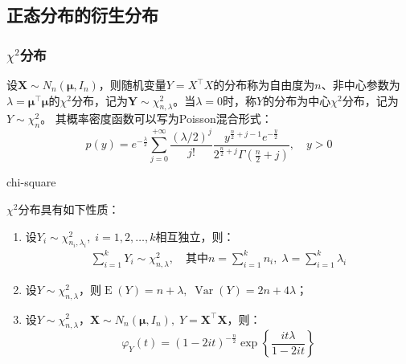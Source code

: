 \subsection{正态分布的衍生分布}
\subsubsection{$\chi^2$分布}
\begin{definition}
	设$\mathbf{X}\sim N_n(\boldsymbol{\mu}, I_n)$，则随机变量$Y=X^{\top}X$的分布称为自由度为$n$、非中心参数为$\lambda=\boldsymbol{\mu}^{\top}\boldsymbol{\mu}$的$\chi^2$分布，记为$\mathbf{Y}\sim \chi^2_{n,\lambda}$。当$\lambda=0$时，称$Y$的分布为中心$\chi^2$分布，记为$Y\sim\chi_n^2$。
	其概率密度函数可以写为Poisson混合形式：
	\begin{equation*}
		p(y)=e^{-\frac{\lambda}{2}}\sum_{j=0}^{+\infty}\frac{(\lambda/2)^j}{j!}
		\frac{y^{\frac{n}{2}+j-1}e^{-\frac{y}{2}}}{2^{\frac{n}{2}+j}\Gamma\left(\frac{n}{2}+j\right)},\quad y>0
	\end{equation*}
\end{definition}
\begin{densityplot}{chi-square}
	\caption{中心 $\chi^2$ 分布 $\chi^2_{4,0}$ 的概率密度函数}
\end{densityplot}
\begin{property}\label{prop:Chi2Distribution}
	$\chi^2$分布具有如下性质：
	\begin{enumerate}
		\item 设$Y_i\sim\chi_{n_i,\lambda_i}^2,\;i=1,2,\dots,k$相互独立，则：
		\begin{gather*}
			\sum_{i=1}^{k}Y_i\sim\chi_{n,\lambda}^2,\quad\text{其中}
			n=\sum_{i=1}^{k}n_i,\;\lambda=\sum_{i=1}^{k}\lambda_i
		\end{gather*}
		\item 设$Y\sim\chi_{n,\lambda}^2$，则$\operatorname{E}(Y)=n+\lambda,\;\operatorname{Var}(Y)=2n+4\lambda$；
		\item 设$Y\sim\chi_{n,\lambda}^2$，$\mathbf{X}\sim N_n(\boldsymbol{\mu},I_n),\;Y=\mathbf{X}^{\top}\mathbf{X}$，则：
		\begin{equation*}
			\varphi_{Y}(t)=(1-2it)^{-\frac{n}{2}}\exp\left\{\frac{it\lambda}{1-2it}\right\}
		\end{equation*}
	\end{enumerate}
\end{property}
